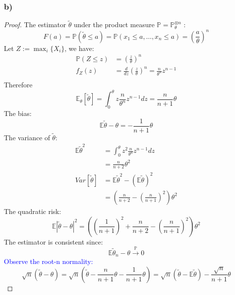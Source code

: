 \documentclass[a4paper,11pt]{article}
\theoremstyle{definition}
\theoremstyle{remark}
\begin{document}
\subsubsection*{b)}
\begin{proof}
	

The estimator $\tilde{\theta}$ under the product measure $\mathbb{P} =  \mathbb{P}^{\otimes n}_\theta$ :
\begin{equation*}
	F(a) = \mathbb{P}(\tilde{\theta} \leq a) = \mathbb{P} (x_1 \leq a, \dots, x_n \leq a) = (\frac{a}{\theta})^n 
\end{equation*}
Let $Z := \max_i\{ X_i\}$, we have:
\begin{equation*}
	\begin{aligned}
		\mathbb{P}(Z \leq z) &= (\frac{z}{\theta})^n\\
		f_Z(z) &= \frac{d}{dz}(\frac{z}{\theta})^n = \frac{n}{\theta^n} z^{n - 1} \\
	\end{aligned}
\end{equation*}
Therefore
\begin{equation*}
	\mathbb{E}_\theta[\tilde{\theta}] = \int_0^\theta z \frac{n}{\theta^n} z^{n - 1} dz = \frac{n}{n + 1} \theta
\end{equation*}
The bias:
\begin{equation*}
	\mathbb{E}\tilde{\theta} - \theta = -\frac{1}{n+1} \theta
\end{equation*}
The variance of $\tilde{\theta}:$
\begin{align*}
	\mathbb{E}\tilde{\theta}^2 &= \int_0^\theta z^2 \frac{n}{\theta^n} z^{n-1} dz\\
	 &= \frac{n}{n+2} \theta^2\\
	Var[\tilde{\theta}] &= \mathbb{E} \tilde{\theta}^2 - (\mathbb{E} \tilde{\theta})^2\\
	 &= (\frac{n}{n+2} - (\frac{n}{n+1})^2)\theta^2
\end{align*}
The quadratic risk:
\begin{equation*}
	\mathbb{E} | \tilde{\theta} - \theta |^2 = ( (\frac{1}{n+1})^2 + \frac{n}{n+2} - (\frac{n}{n+1})^2 )\theta^2
\end{equation*}
The estimator is consistent since:
\begin{equation*}
	\mathbb{E}\tilde{\theta}_n - \theta \overset{\mathbb{P}}{\longrightarrow} 0
\end{equation*}
\textcolor{blue}{Observe the root-n normality:}
\begin{equation*}
	\sqrt{n} (\tilde{\theta} - \theta) = \sqrt{n} (\tilde{\theta} - \frac{n}{n + 1} \theta	- \frac{1}{n+1}\theta) = \sqrt{n}(\tilde{\theta} - \mathbb{E}\tilde{\theta}) - \frac{\sqrt{n}}{n+1}\theta

\end{equation*}
\end{proof}
\end{document}
